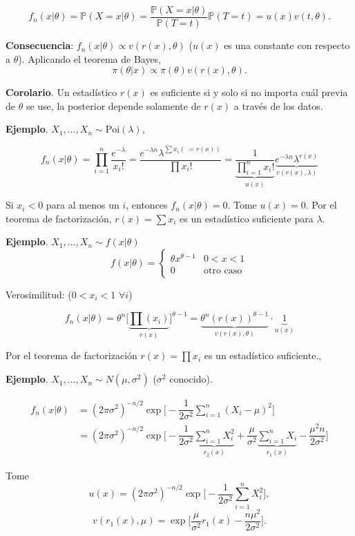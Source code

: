 \documentclass[
  12pt,
]{book}
\begin{document}
\[ f_n(x|\theta) = \mathbb P (X=x|\theta) = \dfrac{\mathbb P(X=x|\theta)}{\mathbb P(T=t)}\mathbb P(T=t) = u(x)v(t,\theta).\]

\textbf{Consecuencia}: \(f_n(x|\theta) \propto v(r(x),\theta)\) (\(u(x)\) es una constante con respecto a \(\theta\)). Aplicando el teorema de Bayes,
\[ \pi(\theta|x) \propto \pi(\theta)v(r(x),\theta).\]

\textbf{Corolario}. Un estadístico \(r(x)\) es suficiente si y solo si no importa cuál previa de \(\theta\) se use, la posterior depende solamente de \(r(x)\) a través de los datos.

\textbf{Ejemplo}. \(X_1,\dots, X_n \sim \text{Poi}(\lambda)\),

\[f_n(x|\theta) = \prod_{i=1}^n \dfrac{e^{-\lambda}}{x_i!} = \dfrac{e^{-\lambda n} \lambda ^{\sum x_i (\;= r(x))}}{\prod x_i!} = \underbrace{\dfrac{1}{\prod_{i=1}^n x_i!}}_{u(x)} \underbrace{e^{-\lambda n}\lambda^{r(x)}}_{v(r(x),\lambda)}\]

Si \(x_i < 0\) para al menos un \(i\), entonces \(f_n(x|\theta) = 0\). Tome \(u(x) = 0\). Por el teorema de factorización, \(r(x) = \sum x_i\) es un estadístico suficiente para \(\lambda\).

\textbf{Ejemplo}. \(X_1,\dots, X_n \sim f(x|\theta)\)
\[ f(x|\theta) = \begin{cases}\theta x^{\theta-1} & 0<x< 1\\ 0 & \text{otro caso}\end{cases}\]

Verosimilitud: (\(0<x_i<1\) \(\forall i\))

\[ f_n(x|\theta) = \theta^n\bigg[\underbrace{\prod(x_i)}_{r(x)}\bigg]^{\theta-1}  = \underbrace{\theta^n(r(x))^{\theta-1}}_{v(r(x),\theta)}\cdot \underbrace{1}_{u(x)}\]

Por el teorema de factorización \(r(x) = \prod x_i\) es un estadístico suficiente.,

\textbf{Ejemplo}. \(X_1,\dots, X_n \sim N(\mu, \sigma^2)\) (\(\sigma^2\) conocido).

\begin{align*} 
f_n(x|\theta) & = (2\pi\sigma^2)^{-n/2} \exp\bigg[-\dfrac{1}{2\sigma^2}\sum_{i=1}^n(X_i-\mu)^2\bigg] \\
& = (2\pi\sigma^2)^{-n/2} \exp\bigg[-\dfrac{1}{2\sigma^2}\underbrace{\sum_{i=1}^n X_i^2}_{r_2(x)}+ \dfrac{\mu}{\sigma^2}\underbrace{\sum_{i=1}^n X_i}_{r_1(x)} - \dfrac{\mu^2 n}{2\sigma^2} \bigg]
\end{align*}

Tome \[u(x) = (2\pi\sigma^2)^{-n/2}\exp\bigg[-\dfrac{1}{2\sigma^2} \displaystyle\sum_{i=1}^n X_i^2\bigg],\]
\[ v(r_{1}(x),\mu) = \exp\bigg[\dfrac{\mu}{\sigma^2}r_{1}(x) - \dfrac{n\mu^2}{2\sigma^2}\bigg]. \]
\end{document}
